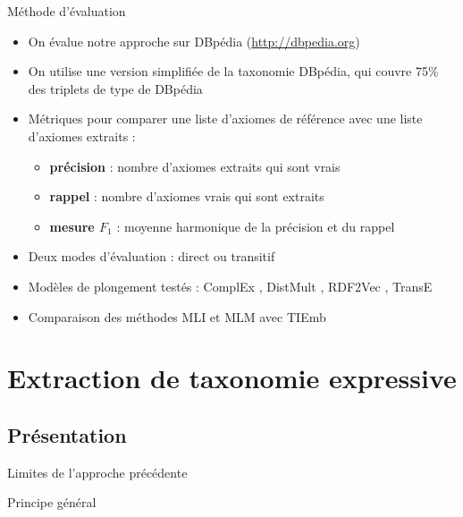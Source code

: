 \documentclass{beamer}
\begin{document}
\begin{frame}{Méthode d'évaluation}
\begin{itemize}
    \item On évalue notre approche sur DBpédia (\href{dbpedia.org}{http://dbpedia.org})
    \item On utilise une version simplifiée de la taxonomie DBpédia, qui couvre 75\% des triplets de type de DBpédia
    \item Métriques pour comparer une liste d'axiomes de référence avec une liste d'axiomes extraits :
    \begin{itemize}
        \item \textbf{précision} : nombre d'axiomes extraits qui sont vrais
        \item \textbf{rappel} : nombre d'axiomes vrais qui sont extraits
        \item \textbf{mesure $F_1$} : moyenne harmonique de la précision et du rappel
    \end{itemize}
    \item Deux modes d'évaluation : direct ou transitif
    \item Modèles de plongement testés : ComplEx \cite{complex}, DistMult \cite{distmult}, RDF2Vec \cite{ristoski2016rdf2vec}, TransE \cite{bordes2013translating}
    \item Comparaison des méthodes MLI et MLM avec TIEmb \cite{ristoski2017large}
\end{itemize}
\end{frame}

\begin{frame}
\resizebox{\columnwidth}{!}{%
  
}
\end{frame}

\section{Extraction de taxonomie expressive}

\subsection{Présentation}
\begin{frame}{Limites de l'approche précédente}
    
\end{frame}

\begin{frame}{Principe général}
    \begin{figure}
        \centering
        
    \end{figure}
\end{frame}
\end{document}
